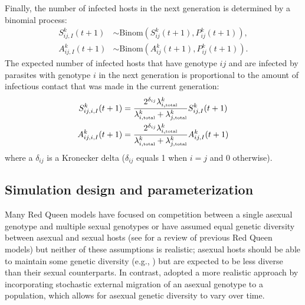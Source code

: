 \documentclass{article}\usepackage[]{graphicx}\usepackage[]{color}
\begin{document}
Finally, the number of infected hosts in the next generation is determined by a binomial process:
\begin{equation}
\begin{aligned}
S_{ij,I}^k (t+1) &\sim \mathrm{Binom}\left(S_{ij}^k (t+1), P_{ij}^k(t+1)\right),\\
A_{ij,I}^k (t+1) &\sim \mathrm{Binom}\left(A_{ij}^k (t+1), P_{ij}^k(t+1)\right).
\end{aligned}
\end{equation}
The expected number of infected hosts that have genotype $ij$ and are infected by parasites with genotype $i$ in the next generation is proportional to the amount of infectious contact that was made in the current generation:
\begin{equation}
\begin{aligned}
S_{ij,i,I}^k(t+1) &=  \frac{2^{\delta_{ij}} \lambda_{i, \textrm{\tiny total}}^k}{\lambda_{i, \textrm{\tiny total}}^k + \lambda_{j, \textrm{\tiny total}}^k} S_{ij,I}^k(t+1)\\
A_{ij,i,I}^k(t+1) &=  \frac{2^{\delta_{ij}} \lambda_{i, \textrm{\tiny total}}^k}{\lambda_{i, \textrm{\tiny total}}^k + \lambda_{j, \textrm{\tiny total}}^k} A_{ij,I}^k(t+1)
\end{aligned}
\end{equation}
where a $\delta_{ij}$ is a Kronecker delta ($\delta_{ij}$ equals 1 when $i = j$ and 0 otherwise).

\subsection{Simulation design and parameterization}

Many Red Queen models have focused on competition between a single asexual genotype
and multiple sexual genotypes or have assumed equal genetic diversity between 
asexual and sexual hosts (see \cite{ashby2015diversity} for a review of previous 
Red Queen models) but neither of these assumptions is realistic;
asexual hosts should be able to maintain some genetic diversity (e.g., \citep{king2011parasites})
but are expected to be less diverse than their sexual counterparts.
In contrast, \cite{ashby2015diversity} adopted a more realistic approach by 
incorporating stochastic external migration of an asexual genotype to a 
population, which allows for asexual genetic diversity to vary over time.
\end{document}
